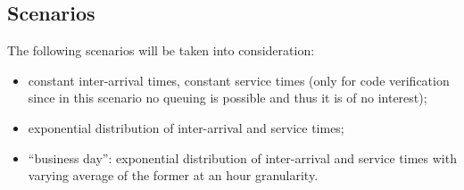 \subsection{Scenarios}
The following scenarios will be taken into consideration:
\begin{itemize}
    \item constant inter-arrival times, constant service times (only for code verification since in this scenario no queuing is possible and thus it is of no interest);
    \item exponential distribution of inter-arrival and service times;
    \item ``business day'': exponential distribution of inter-arrival and service times with varying average of the former at an hour granularity.
\end{itemize}
